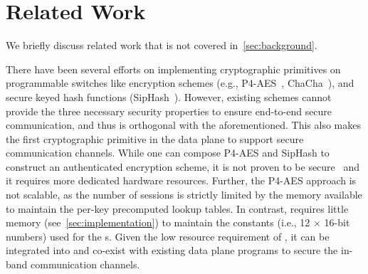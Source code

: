 \section{Related Work}
\label{sec:related}

We briefly discuss related work that is not covered in~\cref{sec:background}.

There have been several efforts on implementing cryptographic primitives on programmable switches like encryption schemes (e.g., P4-AES~\cite{2020-SPIN-P4AES}, ChaCha~\cite{2022-EuroP4-ChaCha}), and secure keyed hash functions (SipHash~\cite{2021-SPIN-HalfSipHash}).
However, existing schemes cannot provide the three necessary security properties to ensure end-to-end secure communication, and thus \sysname is orthogonal with the aforementioned.
This also makes \aead the first cryptographic primitive in the data plane to support secure communication channels.
While one can compose P4-AES and SipHash to construct an authenticated encryption scheme, it is not proven to be secure~\cite{rogaway2002authenticated} and it requires more dedicated hardware resources.
Further, the P4-AES approach is not scalable, as the number of sessions is strictly limited by the memory available to maintain the per-key precomputed lookup tables.
In contrast, \aead requires little memory (see~\cref{sec:implementation}) to maintain the constants (i.e., 12 $\times$ 16-bit numbers) used for the {\pround}s.
Given the low resource requirement of \ascon, it can be integrated into and co-exist with existing data plane programs to secure the in-band communication channels.
